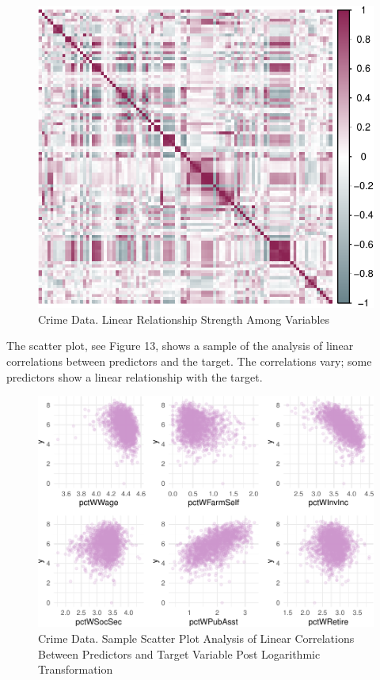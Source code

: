 \documentclass[
  11pt,
]{article}
\begin{document}
\begin{figure}[H]

{\centering \includegraphics[width=1\linewidth]{dissertation_files/figure-latex/Correlations Plot-1} 

}

\caption{Crime Data. Linear Relationship Strength Among Variables}\label{fig:Correlations Plot}
\end{figure}

The scatter plot, see Figure 13, shows a sample of the analysis of
linear correlations between predictors and the target. The correlations
vary; some predictors show a linear relationship with the target.

\begin{figure}[H]

{\centering \includegraphics[width=1\linewidth]{dissertation_files/figure-latex/Scatter Plot-1} 

}

\caption{Crime Data. Sample Scatter Plot Analysis of Linear Correlations Between Predictors and Target Variable Post Logarithmic Transformation}\label{fig:Scatter Plot}
\end{figure}
\end{document}
